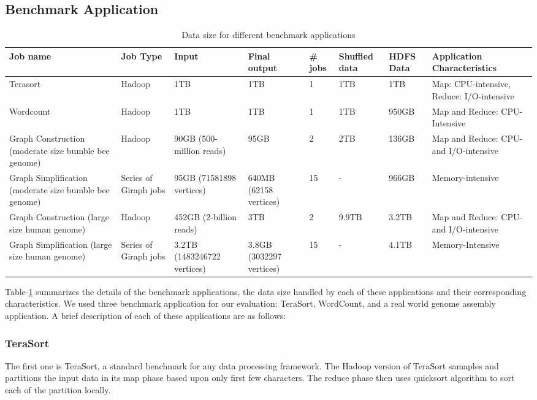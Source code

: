 \documentclass[journal]{IEEEtran}
\begin{document}
\subsection{Benchmark Application}
\begin{table}
\caption{Data size for different benchmark applications}
\label{tab:AppChar}
\begin{center}
    \begin{tabular}{ |p{3cm} | p{1.5cm} | p{2.5cm} | p{2.5cm} | p{0.8cm} | p{0.8cm} | p{0.8cm} | p{2.5cm}|} \hline
     Job name & Job Type & Input & Final output & \# jobs & Shuffled data & HDFS Data & Application Characteristics \\ \hline
    Terasort & Hadoop & 1TB & 1TB & 1 & 1TB & 1TB & Map: CPU-intensive, Reduce: I/O-intensive \\ \hline
    Wordcount & Hadoop & 1TB & 1TB & 1 & 1TB & 950GB & Map and Reduce: CPU-Intensive \\ \hline 
   Graph Construction (moderate size bumble bee genome)  & Hadoop & 90GB (500-million reads) & 95GB & 2 & 2TB & 136GB & Map and Reduce: CPU- and I/O-intensive \\ \hline
    Graph Simplification (moderate size bumble bee genome) & Series of Giraph jobs & 95GB (71581898 vertices) & 640MB (62158 vertices) & 15 & - & 966GB & Memory-intensive\\ \hline    
    Graph Construction (large size human genome) & Hadoop & 452GB (2-billion reads) & 3TB & 2 & 9.9TB & 3.2TB &Map and Reduce: CPU- and I/O-intensive\\ \hline
    Graph Simplification (large size human genome) & Series of Giraph jobs & 3.2TB (1483246722 vertices) & 3.8GB (3032297 vertices) & 15 & - & 4.1TB & Memory-Intensive \\ \hline 
    \end{tabular}
\end{center}
\end{table}
Table-\ref{tab:AppChar} summarizes the details of the benchmark applications, the data size handled by each of these applications and their corresponding characteristics. We used three benchmark application for our evaluation: TeraSort, WordCount, and a real world genome assembly application. A brief description of each of these applications are as follows:

\subsubsection{TeraSort}
The first one is TeraSort, a standard benchmark for any data processing framework. The Hadoop version of TeraSort samaples and partitions the input data in its map phase based upon only first few characters. The reduce phase then uses quicksort algorithm to sort each of the partition locally. 
\end{document}
